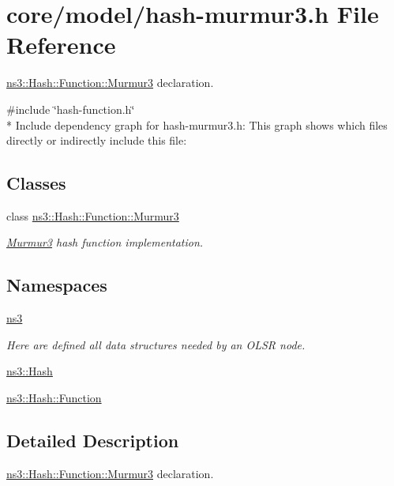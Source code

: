 \hypertarget{hash-murmur3_8h}{}\section{core/model/hash-\/murmur3.h File Reference}
\label{hash-murmur3_8h}


\hyperlink{classns3_1_1Hash_1_1Function_1_1Murmur3}{ns3\+::\+Hash\+::\+Function\+::\+Murmur3} declaration.  


{\ttfamily \#include \char`\"{}hash-\/function.\+h\char`\"{}}\\*
Include dependency graph for hash-\/murmur3.h\+:
This graph shows which files directly or indirectly include this file\+:
\subsection*{Classes}
\begin{DoxyCompactItemize}
\item 
class \hyperlink{classns3_1_1Hash_1_1Function_1_1Murmur3}{ns3\+::\+Hash\+::\+Function\+::\+Murmur3}
\begin{DoxyCompactList}\small\item\em \hyperlink{classns3_1_1Hash_1_1Function_1_1Murmur3}{Murmur3} hash function implementation. \end{DoxyCompactList}\end{DoxyCompactItemize}
\subsection*{Namespaces}
\begin{DoxyCompactItemize}
\item 
 \hyperlink{namespacens3}{ns3}
\begin{DoxyCompactList}\small\item\em Here are defined all data structures needed by an O\+L\+SR node. \end{DoxyCompactList}\item 
 \hyperlink{namespacens3_1_1Hash}{ns3\+::\+Hash}
\item 
 \hyperlink{namespacens3_1_1Hash_1_1Function}{ns3\+::\+Hash\+::\+Function}
\end{DoxyCompactItemize}


\subsection{Detailed Description}
\hyperlink{classns3_1_1Hash_1_1Function_1_1Murmur3}{ns3\+::\+Hash\+::\+Function\+::\+Murmur3} declaration. 

